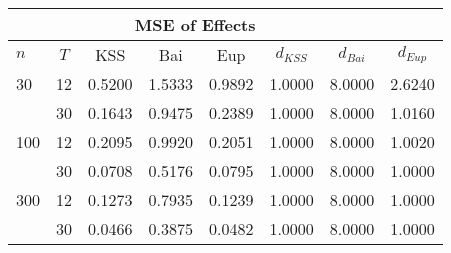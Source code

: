 \begin{tabular}{lccccccc} 
\hline \multicolumn{7}{c}{MSE of Effects} \\ \hline 
$n$ & $T$ & KSS & Bai & Eup & $d_{KSS}$ & $d_{Bai}$ & $d_{Eup}$ \\
\hline
30 & 12 &  0.5200  &  1.5333  &  0.9892  &  1.0000  &  8.0000  &  2.6240  \\
& 30 &  0.1643  &  0.9475  &  0.2389  &  1.0000  &  8.0000  &  1.0160  \\
100 & 12 &  0.2095  &  0.9920  &  0.2051  &  1.0000  &  8.0000  &  1.0020  \\
& 30 &  0.0708  &  0.5176  &  0.0795  &  1.0000  &  8.0000  &  1.0000  \\
300 & 12 &  0.1273  &  0.7935  &  0.1239  &  1.0000  &  8.0000  &  1.0000  \\
& 30 &  0.0466  &  0.3875  &  0.0482  &  1.0000  &  8.0000  &  1.0000  \\
\end{tabular} 
